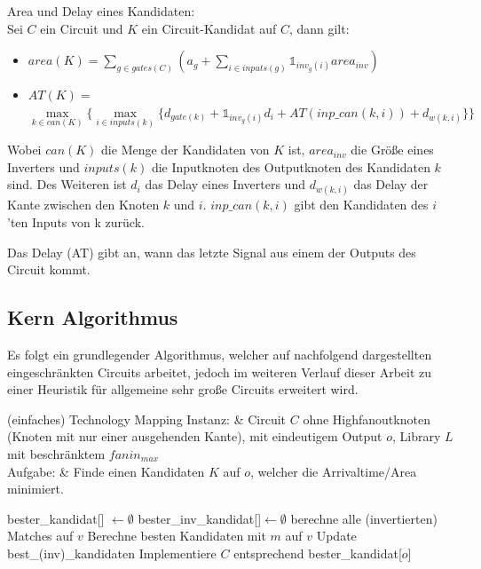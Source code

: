 \documentclass[11pt, a4paper, german]{article}
\begin{document}
\begin{definition}{Area und Delay eines Kandidaten:}\\
\label{def:area_delay}
Sei $C$ ein Circuit und $K$ ein Circuit-Kandidat auf $C$, dann gilt: \\
\begin{itemize}
\item $area(K) = \sum_{g \in gates(C)} (a_g + \sum_{i \in inputs(g)} \mathbb{1}_{inv_g(i)} area_{inv})$ 
\item $AT(K) = $\\$  \max\limits_{k \in can(K)} \{\max\limits_{i \in inputs(k)} \{   d_{gate(k)} + \mathbb{1}_{inv_g(i)} d_{i} + AT(inp\_can(k,i)) + d_{w(k,i)} \} \}$ 
\end{itemize}
Wobei $can(K)$ die Menge der Kandidaten von $K$ ist, $area_{inv}$ die Größe eines Inverters und $inputs(k)$ die Inputknoten des Outputknoten des Kandidaten $k$ sind. Des Weiteren ist $d_i$ das Delay eines Inverters und $d_{w(k,i)} $ das Delay der Kante zwischen den Knoten $k$ und $i$. $inp\_can(k,i)$ gibt den Kandidaten des $i$'ten Inputs von k zurück. 

\end{definition}

Das Delay (AT) gibt an, wann das letzte Signal aus einem der Outputs des Circuit kommt.

\subsection{Kern Algorithmus}
\label{subsec:kern_algorithmus}

Es folgt ein grundlegender Algorithmus, welcher auf nachfolgend dargestellten eingeschränkten Circuits arbeitet, jedoch im weiteren Verlauf dieser Arbeit zu einer Heuristik für allgemeine sehr große Circuits erweitert wird.

\begin{problem}[framed]{(einfaches) Technology Mapping}
  Instanz:  & Circuit $C$ ohne Highfanoutknoten (Knoten mit nur einer ausgehenden Kante), mit eindeutigem Output $o$, Library $L$ mit beschr\"anktem $fanin_{max}$\\
  Aufgabe: &  Finde einen Kandidaten $K$ auf $o$, welcher die Arrivaltime/Area minimiert.
\end{problem}

\begin{algorithm}[H]
 \LinesNumbered
 \DontPrintSemicolon
 \caption{(einfaches) Technology Mapping}

 bester\_kandidat[] $\gets \emptyset$\;
 bester\_inv\_kandidat[]$ \gets \emptyset$\;
 {
   berechne alle (invertierten) Matches auf $v$\;
   {
      Berechne besten Kandidaten mit $m$ auf $v$\;
      Update best\_(inv)\_kandidaten\;
   }
 }
 Implementiere $C$ entsprechend bester\_kandidat[$o$]\;
\end{algorithm}\ \\
\end{document}
